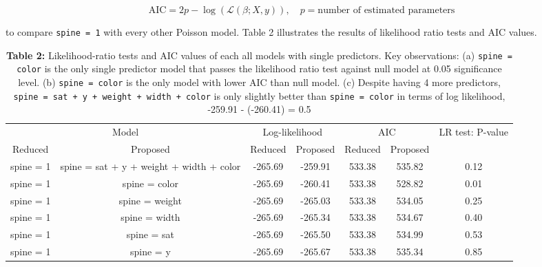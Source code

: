 \documentclass[a4paper, 12pt]{article}
\begin{document}
$$\text{AIC} = 2p - \log(\mathcal{L}(\beta; X, y)), \quad p = \text{number of estimated parameters}$$

\noindent to compare \texttt{spine = 1} with every other Poisson model. Table 2 illustrates the results of likelihood ratio tests and AIC values. 

\begin{table}[htbp]
  \centering
    \begin{tabular}{|c|c|c|c|c|c|c|}
    \toprule
    \multicolumn{2}{|p{12.445em}|}{Model} & \multicolumn{2}{p{8em}|}{Log-likelihood} & \multicolumn{2}{p{8em}|}{AIC} & \multicolumn{1}{c|}{\multirow{2}[4]{*}{LR test: P-value}} \\
\cmidrule{1-6}    \multicolumn{1}{|p{4.5em}|}{Reduced} & \multicolumn{1}{p{7.945em}|}{Proposed} & \multicolumn{1}{p{4em}|}{Reduced} & Proposed & \multicolumn{1}{p{4em}|}{Reduced} & Proposed &  \\
    \midrule
    spine = 1  & \multicolumn{1}{p{7.945em}|}{spine = sat + y + weight + width + color } & -265.69 & -259.91 & 533.38 & 535.82 & 0.12 \\
    spine = 1  & spine = color  & -265.69 & -260.41 & \cellcolor[rgb]{ 1,  .949,  .8}533.38 & \cellcolor[rgb]{ 1,  .949,  .8}528.82 & \cellcolor[rgb]{ 1,  .78,  .808}\textcolor[rgb]{ .612,  0,  .024}{0.01} \\
    spine = 1  & spine = weight  & -265.69 & -265.03 & 533.38 & 534.05 & 0.25 \\
    spine = 1  & spine = width  & -265.69 & -265.34 & 533.38 & 534.67 & 0.40 \\
    spine = 1  & spine = sat  & -265.69 & -265.50 & 533.38 & 534.99 & 0.53 \\
    spine = 1  & spine = y  & -265.69 & -265.67 & 533.38 & 535.34 & 0.85 \\
    \bottomrule
    \end{tabular}%
    \centering
    \caption*{\textbf{Table 2:} Likelihood-ratio tests and AIC values of each all models with single predictors. Key observations: (a) \texttt{spine = color} is the only single predictor model that passes the likelihood ratio test against null model at 0.05 significance level. (b) \texttt{spine = color} is the only model with lower AIC than null model. (c) Despite having 4 more predictors, \texttt{spine = sat + y + weight + width + color} is only slightly better than \texttt{spine = color} in terms of log likelihood, -259.91 - (-260.41) = 0.5}
\end{table}%
\end{document}
